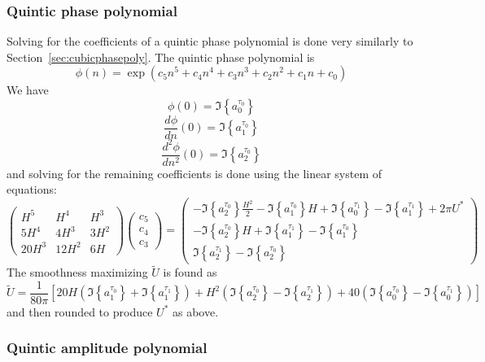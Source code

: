 \documentclass[letterpaper,12pt]{report}
\newcommand\ImNe[1]{\Im \left\{ #1 \right\}}
\begin{document}
\subsubsection{Quintic phase polynomial\label{sec:quinticphasepoly}}

Solving for the coefficients of a quintic phase polynomial is done very
similarly to Section~\ref{sec:cubicphasepoly}. The quintic phase polynomial is
\begin{equation}
    \label{eq:quinticphasepoly}
    \phi(n) = \exp \left(c_5 n^{5} + c_4 n^{4} + c_3 n^{3} + c_2 n^{2} + c_1 n + c_0 \right)
\end{equation}
We have
\[
    \phi(0) = \Im \left\{ a^{\tau_0}_0 \right\}
\]
\[
    \frac{d \phi}{d n}(0) = \Im \left\{ a^{\tau_0}_1 \right\}
\]
\[
    \frac{d^{2} \phi}{d n^{2}}(0) = \Im \left\{ a^{\tau_0}_2 \right\}
\]
and solving for the remaining coefficients is done using the linear system of
equations:
\begin{equation}
    \begin{pmatrix}
        H^5 & H^4 & H^3 \\
        5 H^4 & 4 H^3 & 3 H^2 \\
        20 H^3 & 12 H^2 & 6 H
    \end{pmatrix}
    \begin{pmatrix}
        c_5 \\
        c_4 \\
        c_3
    \end{pmatrix}
    =
    \begin{pmatrix}
        -\ImNe{ a^{\tau_0}_2 } \frac{ H^{2} }{2} - \ImNe{ a^{\tau_0}_1 } H +
            \ImNe{ a^{\tau_1}_0 } - \ImNe{ a^{\tau_1}_1 } + 2 \pi U^{\ast}\\
        -\ImNe{ a^{\tau_0}_2 } H + \ImNe{ a^{\tau_1}_1 } - \ImNe{ a^{\tau_0}_1 } \\
        \ImNe{ a^{\tau_1}_2 } - \ImNe{ a^{\tau_0}_2 }
    \end{pmatrix}
\end{equation}
The smoothness maximizing $\tilde{U}$ is found as
\[
    \tilde{U} = \frac{1}{80 \pi} \left[ 20 H ( \ImNe{ a^{\tau_0}_1 } + \ImNe{ a^{\tau_1}_1 } )
        + H^2 ( \ImNe{ a^{\tau_0}_2 } - \ImNe{ a^{\tau_1}_2 } )
        + 40 ( \ImNe{ a^{\tau_0}_0 } - \ImNe{ a^{\tau_1}_0 } ) \right]
\]
and then rounded to produce $U^{\ast}$ as above.

\subsubsection{Quintic amplitude polynomial}
\end{document}
